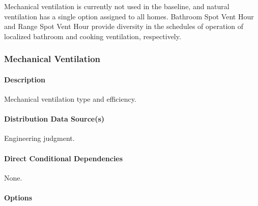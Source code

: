 Mechanical ventilation is currently not used in the baseline, and natural ventilation has a single option assigned to all homes. Bathroom Spot Vent Hour and Range Spot Vent Hour provide diversity in the schedules of operation of localized bathroom and cooking ventilation, respectively.


\subsubsection{Mechanical Ventilation}

\paragraph{Description}
Mechanical ventilation type and efficiency.

\paragraph{Distribution Data Source(s)}
Engineering judgment.

\paragraph{Direct Conditional Dependencies}
None.

\paragraph{Options}


